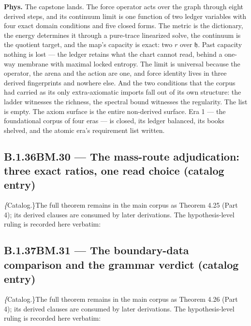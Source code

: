\documentclass[11pt,openany]{report}
\theoremstyle{canonplain}
\theoremstyle{canondef}
\begin{document}
\textbf{Phys.} The capstone lands. The force operator acts over the graph through eight derived steps, and its continuum limit is one function of two ledger variables with four exact domain conditions and five closed forms. The metric is the dictionary, the energy determines it through a pure-trace linearized solve, the continuum is the quotient target, and the map's capacity is exact: two $r$ over $\mathfrak h$. Past capacity nothing is lost — the ledger retains what the chart cannot read, behind a one-way membrane with maximal locked entropy. The limit is universal because the operator, the arena and the action are one, and force identity lives in three derived fingerprints and nowhere else. And the two conditions that the corpus had carried as its only extra-axiomatic imports fall out of its own structure: the ladder witnesses the richness, the spectral bound witnesses the regularity. The list is empty. The axiom surface is the entire non-derived surface. Era 1 — the foundational corpus of four eras — is closed, its ledger balanced, its books shelved, and the atomic era's requirement list written.

\medskip
\subsection*{\texorpdfstring{B.1.36\quad BM.30 — The mass-route adjudication: three exact ratios, one read choice (catalog entry)}{BM.30 B.1.36}}
\label{tag:BM-30-cat}
{\small \textit\{Catalog.\}\quad The full theorem remains in the main corpus as Theorem 4.25 (Part 4); its derived clauses are consumed by later derivations. The hypothesis-level ruling is recorded here verbatim:}
\begin{quote}\small \end{quote}
\medskip
\subsection*{\texorpdfstring{B.1.37\quad BM.31 — The boundary-data comparison and the grammar verdict (catalog entry)}{BM.31 B.1.37}}
\label{tag:BM-31-cat}
{\small \textit\{Catalog.\}\quad The full theorem remains in the main corpus as Theorem 4.26 (Part 4); its derived clauses are consumed by later derivations. The hypothesis-level ruling is recorded here verbatim:}
\begin{quote}\small \end{quote}
\medskip
\end{document}

